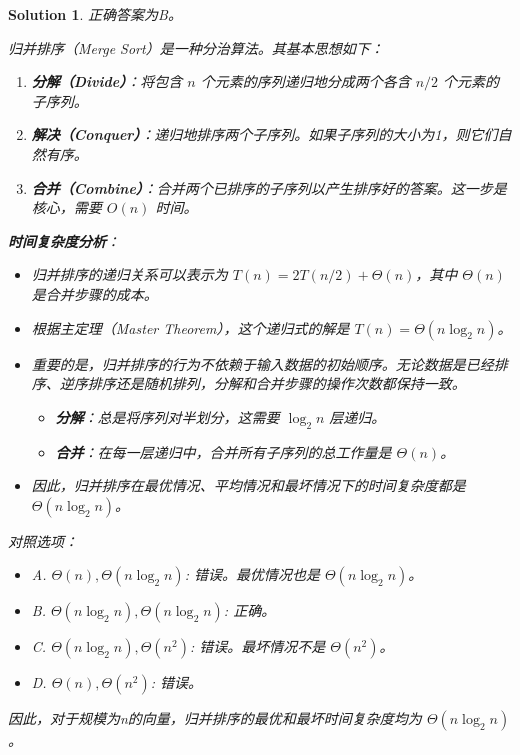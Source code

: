 \documentclass[UTF8]{report}
\newtheorem{solution}{Solution}
\theoremstyle{MyLineTheoremStyle} %
\theoremstyle{MyBlockTheoremStyle} %
\theoremstyle{MySubsubsectionStyle} %
\begin{document}
\begin{solution}
正确答案为B。

归并排序（Merge Sort）是一种分治算法。其基本思想如下：
\begin{enumerate}
    \item \textbf{分解（Divide）}：将包含 $n$ 个元素的序列递归地分成两个各含 $n/2$ 个元素的子序列。
    \item \textbf{解决（Conquer）}：递归地排序两个子序列。如果子序列的大小为1，则它们自然有序。
    \item \textbf{合并（Combine）}：合并两个已排序的子序列以产生排序好的答案。这一步是核心，需要 $O(n)$ 时间。
\end{enumerate}

\textbf{时间复杂度分析}：
\begin{itemize}
    \item 归并排序的递归关系可以表示为 $T(n) = 2T(n/2) + \Theta(n)$，其中 $\Theta(n)$ 是合并步骤的成本。
    \item 根据主定理（Master Theorem），这个递归式的解是 $T(n) = \Theta(n \log_2 n)$。
    \item 重要的是，归并排序的行为不依赖于输入数据的初始顺序。无论数据是已经排序、逆序排序还是随机排列，分解和合并步骤的操作次数都保持一致。
    \begin{itemize}
        \item \textbf{分解}：总是将序列对半划分，这需要 $\log_2 n$ 层递归。
        \item \textbf{合并}：在每一层递归中，合并所有子序列的总工作量是 $\Theta(n)$。
    \end{itemize}
    \item 因此，归并排序在最优情况、平均情况和最坏情况下的时间复杂度都是 $\Theta(n \log_2 n)$。
\end{itemize}

对照选项：
\begin{itemize}
    \item A. $\Theta(n), \Theta(n\log_{2}n)$: 错误。最优情况也是 $\Theta(n\log_{2}n)$。
    \item B. $\Theta(n\log_{2}n), \Theta(n\log_{2}n)$: 正确。
    \item C. $\Theta(n\log_{2}n), \Theta(n^2)$: 错误。最坏情况不是 $\Theta(n^2)$。
    \item D. $\Theta(n), \Theta(n^2)$: 错误。
\end{itemize}
因此，对于规模为n的向量，归并排序的最优和最坏时间复杂度均为 $\Theta(n\log_{2}n)$。
\end{solution}
\end{document}

